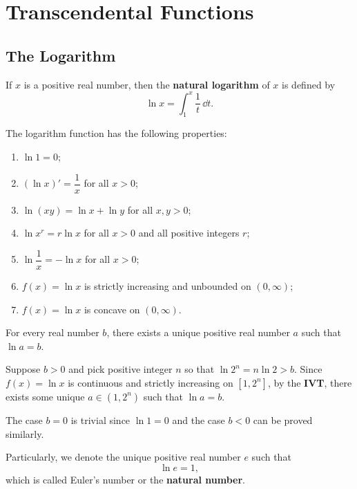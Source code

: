 	\chapter{Transcendental Functions}
	\section{The Logarithm}
	\begin{definitionenv}
		If $x$ is a positive real number, then the \textbf{natural logarithm} of $x$ is defined by
		\[
		\ln x = \int_1^x \frac{1}{t}\, \dd t.
		\]
	\end{definitionenv}
	\begin{theoremenv}
		The logarithm function has the following properties:
		\begin{enumerate}
			\item [(1)] $\ln 1 = 0$;
			\item [(2)] $(\ln x)' = \dfrac{1}{x}$ for all $x>0$;
			\item [(3)] $\ln (xy) = \ln x + \ln y$ for all $x,y>0$;
			\item [(4)] $\ln x^r = r \ln x$ for all $x>0$ and all positive integers $r$;
			\item [(5)] $\ln \dfrac{1}{x} = - \ln x$ for all $x>0$;
			\item [(6)] $f(x)=\ln x$ is strictly increasing and unbounded on $(0,\infty)$;
			\item [(7)] $f(x)=\ln x$ is concave on $(0,\infty)$.
		\end{enumerate}
	\end{theoremenv}
	\begin{theoremenv}
		For every real number $b$, there exists a unique positive real number $a$ such that $\ln a = b$.
	\end{theoremenv}
	\begin{proofenv}
		Suppose $b>0$ and pick positive integer $n$ so that $\ln 2^n = n \ln 2 > b$. Since $f(x) = \ln x$ is continuous and strictly increasing on $[1, 2^n]$, by the \textbf{IVT}, there exists some unique $a\in (1, 2^n)$ such that $\ln a = b$.

		The case $b=0$ is trivial since $\ln 1 = 0$ and the case $b<0$ can be proved similarly.
	\end{proofenv}
	\begin{definitionenv}
		Particularly, we denote the unique positive real number $e$ such that
		\[
		\ln e = 1,
		\]
		which is called Euler's number or the \textbf{natural number}.
	\end{definitionenv}
